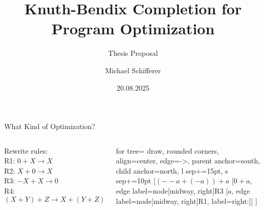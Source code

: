 \documentclass[14pt, aspectratio=169]{beamer}
\title{Knuth-Bendix Completion for\\ Program Optimization}
\subtitle{Thesis Proposal}
\author{Michael Schifferer}
\date{20.08.2025}
\begin{document}
	\maketitle
	
	\begin{frame}{What Kind of Optimization?}
		\begin{columns}

				Rewrite rules:\\
			R1: $0 + X \rightarrow X$\\
			R2: $X + 0 \rightarrow X$\\
			R3: $-X + X \rightarrow 0$\\
			R4: $(X +Y) + Z \rightarrow X + (Y + Z)$
			
					\begin{minipage}[c][1\textheight][c]{\linewidth}
					\begin{forest}
					for tree={
						draw,                   %
						rounded corners,        %
						align=center,           %
						edge={->},              %
						parent anchor=south,    %
						child anchor=north,     %
						l sep+=15pt,            %
						s sep+=10pt             %
					}
					[$(--a + (-a)) + a$
					[$0 + a$, edge label={node[midway, right]{R3}}
					[$a$, edge label={node[midway, right]{R1}}, label=right:{\textcolor{green}{\checkmark}}]]
					]
				\end{forest}
			\end{minipage}
			\end{columns}
			\end{frame}
\end{document}

